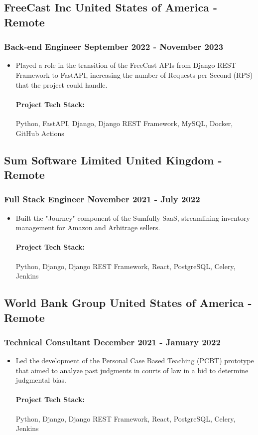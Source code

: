 \documentclass[11pt]{article} %
\begin{document}
\subsection{FreeCast Inc \hfill United States of America - Remote}
\subsubsection{Back-end Engineer \hfill  September 2022 - November 2023}
\begin{itemize}
    \item Played a role in the transition of the FreeCast APIs from Django REST Framework to FastAPI, increasing the number of Requests per Second (RPS) that the project could handle.

    \paragraph{Project Tech Stack:} Python, FastAPI, Django, Django REST Framework, MySQL, Docker, GitHub Actions
\end{itemize}

\subsection{Sum Software Limited \hfill United Kingdom - Remote}
\subsubsection{Full Stack Engineer \hfill  November 2021 - July 2022}
\begin{itemize}
    \item Built the "Journey" component of the Sumfully SaaS, streamlining inventory management for Amazon and Arbitrage sellers.

    \paragraph{Project Tech Stack:} Python, Django, Django REST Framework, React, PostgreSQL, Celery, Jenkins
\end{itemize}


\subsection{World Bank Group \hfill United States of America - Remote}
\subsubsection{Technical Consultant \hfill  December 2021 - January 2022}
\begin{itemize}
    \item Led the development of the Personal Case Based Teaching (PCBT) prototype that aimed to analyze past judgments in courts of law in a bid to determine judgmental bias.

    \paragraph{Project Tech Stack:} Python, Django, Django REST Framework, React, PostgreSQL, Celery, Jenkins
\end{itemize}
\end{document}
